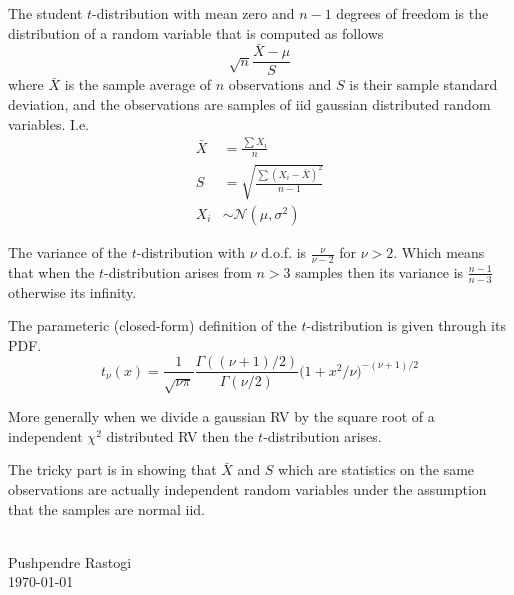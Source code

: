 \documentclass[preview,border={10 10 10 10}]{standalone}
\begin{document}
The student $t$-distribution with mean zero and $n-1$ degrees of freedom is the distribution of a random variable that is computed as follows
\begin{equation*}
    \sqrt{n} \frac{\bar{X} - \mu}{S}
\end{equation*}
where $\bar{X}$ is the sample average of $n$ observations and $S$ is their sample standard deviation, and the observations are samples of iid gaussian distributed random variables. I.e. 
\begin{align}
\bar{X} &= \frac{\sum X_i}{n}\\
S &= \sqrt{\frac{\sum(X_i - \bar{X})^2}{n-1}}\\
X_i &\sim \mathcal{N}(\mu, \sigma^2)
\end{align}

The variance of the $t$-distribution with $\nu$ d.o.f. is $\frac{\nu}{\nu-2}$ for $\nu > 2$. Which means that when the $t$-distribution arises from $n > 3$ samples then its variance is $\frac{n-1}{n-3}$ otherwise its infinity.

The parameteric (closed-form) definition of the $t$-distribution is given through its PDF.
\begin{equation}
    t_\nu(x) = \frac{1}{\sqrt{\nu\pi}}\frac{\Gamma((\nu+1)/2)}{\Gamma(\nu/2)}\big(1 + x^2/\nu\big)^{-(\nu+1)/2}
\end{equation}

More generally when we divide a gaussian RV by the square root of a independent  $\chi^2$ distributed RV then the $t$-distribution arises. 

The tricky part is in showing that $\bar{X}$ and $S$ which are statistics on the same observations are actually independent random variables under the assumption that the samples are normal iid.

~\\Pushpendre Rastogi\\
\today
\end{document}
